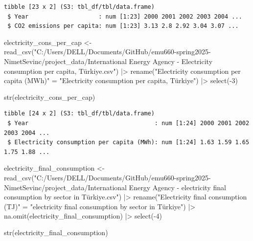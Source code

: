 \documentclass[
  letterpaper,
  DIV=11,
  numbers=noendperiod]{scrartcl}
\newenvironment{Shaded}{\begin{snugshade}}{\end{snugshade}}
\newcommand{\DecValTok}[1]{\textcolor[rgb]{0.68,0.00,0.00}{#1}}
\newcommand{\FunctionTok}[1]{\textcolor[rgb]{0.28,0.35,0.67}{#1}}
\newcommand{\NormalTok}[1]{\textcolor[rgb]{0.00,0.23,0.31}{#1}}
\newcommand{\OtherTok}[1]{\textcolor[rgb]{0.00,0.23,0.31}{#1}}
\newcommand{\SpecialCharTok}[1]{\textcolor[rgb]{0.37,0.37,0.37}{#1}}
\newcommand{\StringTok}[1]{\textcolor[rgb]{0.13,0.47,0.30}{#1}}
\begin{document}
\begin{verbatim}
tibble [23 x 2] (S3: tbl_df/tbl/data.frame)
 $ Year                    : num [1:23] 2000 2001 2002 2003 2004 ...
 $ CO2 emissions per capita: num [1:23] 3.13 2.8 2.92 3.04 3.07 ...
\end{verbatim}

\begin{Shaded}
\begin{Highlighting}[]
\NormalTok{electricity\_cons\_per\_cap }\OtherTok{\textless{}{-}} \FunctionTok{read\_csv}\NormalTok{(}\StringTok{"C:/Users/DELL/Documents/GitHub/emu660{-}spring2025{-}NimetSevinc/project\_data/International Energy Agency {-} Electricity consumption per capita, Türkiye.csv"}\NormalTok{) }\SpecialCharTok{|\textgreater{}} \FunctionTok{rename}\NormalTok{(}\StringTok{"Electricity consumption per capita (MWh)"} \OtherTok{=} \StringTok{"Electricity consumption per capita, Türkiye"}\NormalTok{) }\SpecialCharTok{|\textgreater{}} \FunctionTok{select}\NormalTok{(}\SpecialCharTok{{-}}\DecValTok{3}\NormalTok{)}

\FunctionTok{str}\NormalTok{(electricity\_cons\_per\_cap)}
\end{Highlighting}
\end{Shaded}

\begin{verbatim}
tibble [24 x 2] (S3: tbl_df/tbl/data.frame)
 $ Year                                    : num [1:24] 2000 2001 2002 2003 2004 ...
 $ Electricity consumption per capita (MWh): num [1:24] 1.63 1.59 1.65 1.75 1.88 ...
\end{verbatim}

\begin{Shaded}
\begin{Highlighting}[]
\NormalTok{electricity\_final\_consumption }\OtherTok{\textless{}{-}} \FunctionTok{read\_csv}\NormalTok{(}\StringTok{"C:/Users/DELL/Documents/GitHub/emu660{-}spring2025{-}NimetSevinc/project\_data/International Energy Agency {-} electricity final consumption by sector in Türkiye.csv"}\NormalTok{) }\SpecialCharTok{|\textgreater{}} \FunctionTok{rename}\NormalTok{(}\StringTok{"Electricity final consumption (TJ)"} \OtherTok{=} \StringTok{"electricity final consumption by sector in Türkiye"}\NormalTok{) }\SpecialCharTok{|\textgreater{}} \FunctionTok{na.omit}\NormalTok{(electricity\_final\_consumption) }\SpecialCharTok{|\textgreater{}} \FunctionTok{select}\NormalTok{(}\SpecialCharTok{{-}}\DecValTok{4}\NormalTok{)}


\FunctionTok{str}\NormalTok{(electricity\_final\_consumption)}
\end{Highlighting}
\end{Shaded}
\end{document}
